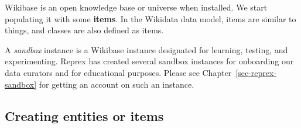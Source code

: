 \documentclass[
  letterpaper,
  DIV=11,
  numbers=noendperiod]{scrreprt}
\begin{document}
Wikibase is an open knowledge base or universe when installed. We start
populating it with some \textbf{items}. In the Wikidata data model,
items are similar to things, and classes are also defined as items.

\begin{tcolorbox}[enhanced jigsaw, opacityback=0, bottomrule=.15mm, rightrule=.15mm, toptitle=1mm, breakable, colbacktitle=quarto-callout-note-color!10!white, colback=white, title=\textcolor{quarto-callout-note-color}{\faInfo}\hspace{0.5em}{Note}, leftrule=.75mm, toprule=.15mm, left=2mm, arc=.35mm, colframe=quarto-callout-note-color-frame, coltitle=black, titlerule=0mm, bottomtitle=1mm, opacitybacktitle=0.6]

A \emph{sandbox} instance is a Wikibase instance designated for
learning, testing, and experimenting. Reprex has created several sandbox
instances for onboarding our data curators and for educational purposes.
Please see Chapter~\ref{sec-reprex-sandbox} for getting an account on
such an instance.

\end{tcolorbox}

\subsection{Creating entities or
items}\label{creating-entities-or-items}
\end{document}
